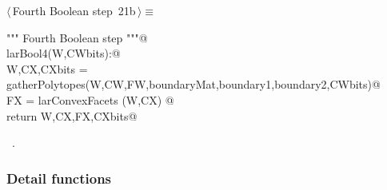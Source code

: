 \documentclass[11pt,oneside]{article}	%
\begin{document}
\begin{flushleft} \small \label{scrap24}
\protect{}$\langle\,$Fourth Boolean step\nobreak\ {\footnotesize 21b}$\,\rangle\equiv$
\vspace{-1ex}
\begin{list}{}{} \item
\mbox{}\verb@""" Fourth Boolean step """@\\
\mbox{}\verb@def larBool4(W,CWbits):@\\
\mbox{}\verb@   W,CX,CXbits = gatherPolytopes(W,CW,FW,boundaryMat,boundary1,boundary2,CWbits)@\\
\mbox{}\verb@   FX = larConvexFacets (W,CX)      @\\
\mbox{}\verb@   return W,CX,FX,CXbits@\\
\mbox{}\verb@@{\NWsep}
\end{list}
\vspace{-1ex}
\footnotesize\addtolength{\baselineskip}{-1ex}
\begin{list}{}{\setlength{\itemsep}{-\parsep}\setlength{\itemindent}{-\leftmargin}}
\item \NWtxtMacroRefIn\ .
\end{list}
\end{flushleft}



\subsubsection{Detail functions}
\end{document}
